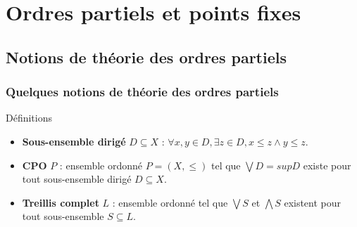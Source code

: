 \documentclass{beamer}
\begin{document}
\section{Ordres partiels et points fixes}


\subsection{Notions de théorie des ordres partiels}

\begin{frame}
\frametitle{Quelques notions de théorie des ordres partiels}

\begin{block}{Définitions}
\begin{itemize}
\item \textbf{Sous-ensemble dirigé} $D \subseteq X$ : %
$\forall x, y \in D, \exists z \in D, x \leq z \wedge y \leq z$.
\item \textbf{CPO} $P$ : ensemble ordonné $P = (X, \leq)$ tel que $\bigvee D = sup D$ existe pour tout sous-ensemble dirigé $D \subseteq X$.

\item \textbf{Treillis complet} $L$ : ensemble ordonné tel que $\bigvee S$ et $\bigwedge S$ existent pour tout sous-ensemble $S \subseteq L$.
\end{itemize}
\end{block}


\end{frame}
\end{document}
